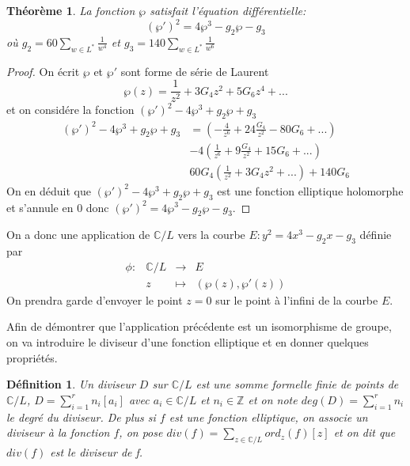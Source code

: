 \documentclass{article}
\newtheorem{definition}{Définition}
\newtheorem{theoreme}{Théorème}
\begin{document}
\begin{theoreme}
La fonction $\wp$ satisfait l'équation différentielle:
\begin{equation*}
(\wp')^2 = 4\wp^3 - g_{2}\wp - g_{3}
\end{equation*}
où $g_{2} = 60\sum_{w\in L^{*}}{\frac{1}{w^4}}$ et $g_{3} = 140\sum_{w\in L^{*}}{\frac{1}{w^6}}$
\end{theoreme}

\begin{proof}
On écrit $\wp$ et $\wp'$ sont forme de série de Laurent
\begin{equation*}
\wp(z) = \frac{1}{z^2} + 3G_{4}z^2 + 5G_{6}z^4 + ...
\end{equation*}
et on considére la fonction $(\wp')^2 - 4\wp^3 + g_{2}\wp + g_{3}$
\begin{align*}
(\wp')^2 - 4\wp^3 + g_{2}\wp + g_{3} &= (-\frac{4}{z^6} + 24\frac{G_{4}}{z^2} - 80G_{6} + ...) \\
									 & - 4(\frac{1}{z^6} + 9\frac{G_{4}}{z^2} + 15G_{6} + ...) \\
									 & 60G_{4}(\frac{1}{z^2} + 3G_{4}z^2 + ...) + 140G_{6}
\end{align*}
On en déduit que $(\wp')^2 - 4\wp^3 + g_{2}\wp + g_{3}$ est une fonction elliptique holomorphe et s'annule en $0$
donc $(\wp')^2 = 4\wp^3 - g_{2}\wp - g_{3}$.
\end{proof}
On a donc une application de $\mathbb{C}/L$ vers la courbe $E: y^2 = 4x^3 - g_{2}x - g_{3}$ définie par
\begin{equation*}
\begin{array}{lrcl}
\phi :&\mathbb{C}/L & \longrightarrow & E \\
	 & z & \longmapsto & (\wp(z), \wp'(z))
\end{array}
\end{equation*}
On prendra garde d'envoyer le point $z=0$ sur le point à l'infini de la courbe $E$.

Afin de démontrer que l'application précédente est un isomorphisme de groupe, on va introduire le diviseur
d'une fonction elliptique et en donner quelques propriétés.

\begin{definition}
Un diviseur $D$ sur $\mathbb{C}/L$ est une somme formelle finie de points de $\mathbb{C}/L$, 
$D=\sum_{i=1}^{r}{n_{i}[a_{i}]}$ avec $a_{i}\in \mathbb{C}/L$ et $n_{i}\in \mathbb{Z}$ et on note 
$deg(D) = \sum_{i=1}^{r}{n_{i}}$ le degré du diviseur.
De plus si $f$ est une fonction elliptique, on associe un diviseur à la fonction $f$, on pose 
$div(f)=\sum_{z\in \mathbb{C}/L}{ord_{z}(f)[z]}$  et on dit que $div(f)$ est le diviseur de f.
\end{definition}
\end{document}
